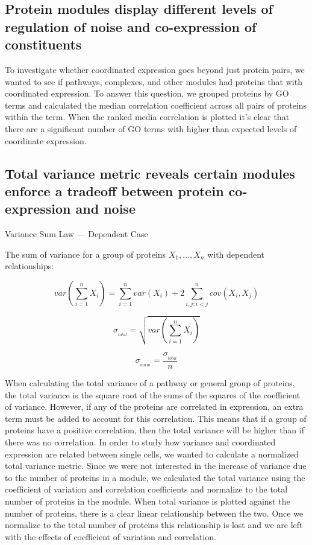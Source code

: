 \documentclass[11pt,twocolumn]{article}
\begin{document}
\hypertarget{protein-modules-display-different-levels-of-regulation-of-noise-and-co-expression-of-constituents}{%
\subsection{Protein modules display different levels of regulation of
noise and co-expression of
constituents}\label{protein-modules-display-different-levels-of-regulation-of-noise-and-co-expression-of-constituents}}

To investigate whether coordinated expression goes beyond just protein
pairs, we wanted to see if pathways, complexes, and other modules had
proteins that with coordinated expression. To answer this question, we
grouped proteins by GO terms and calculated the median correlation
coefficient across all pairs of proteins within the term. When the
ranked media correlation is plotted it's clear that there are a
significant number of GO terms with higher than expected levels of
coordinate expression.

\hypertarget{total-variance-metric-reveals-certain-modules-enforce-a-tradeoff-between-protein-co-expression-and-noise}{%
\subsection{Total variance metric reveals certain modules enforce a
tradeoff between protein co-expression and
noise}\label{total-variance-metric-reveals-certain-modules-enforce-a-tradeoff-between-protein-co-expression-and-noise}}

Variance Sum Law --- Dependent Case

The sum of variance for a group of proteins \(X_{1},\dotsc,X_{n}\) with
dependent relationships:

\[var\left(\sum_{i=1}^n X_{i}\right) = \sum_{i=1}^{n} var(X_{i}) + 2\sum_{i,j:i<j}^{n} cov(X_{i},X_{j})\]

\[\sigma_{{}_{total}} = \sqrt{var\left(\sum_{i=1}^n X_{i}\right)}\]

\[\sigma_{{}_{norm}} = \dfrac{\sigma_{{}_{total}}}{n}\]

When calculating the total variance of a pathway or general group of
proteins, the total variance is the square root of the sums of the
squares of the coefficient of variance. However, if any of the proteins
are correlated in expression, an extra term must be added to account for
this correlation. This means that if a group of proteins have a positive
correlation, then the total variance will be higher than if there was no
correlation. In order to study how variance and coordinated expression
are related between single cells, we wanted to calculate a normalized
total variance metric. Since we were not interested in the increase of
variance due to the number of proteins in a module, we calculated the
total variance using the coefficient of variation and correlation
coefficients and normalize to the total number of proteins in the
module. When total variance is plotted against the number of proteins,
there is a clear linear relationship between the two. Once we normalize
to the total number of proteins this relationship is lost and we are
left with the effects of coefficient of variation and correlation.
\end{document}
